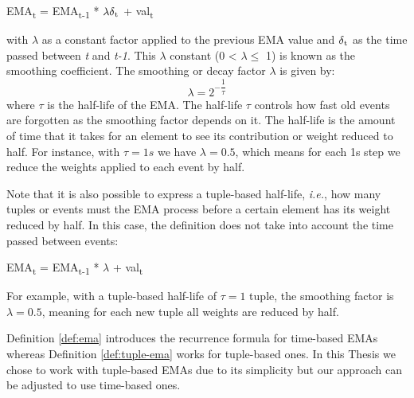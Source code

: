 \begin{definition}
EMA\textsubscript{t} = EMA\textsubscript{t-1} * $\lambda\delta\textsubscript{t}$ + val\textsubscript{t}
\label{def:ema}
\end{definition}

with $\lambda$ as a constant factor applied to the previous EMA value and $\delta\textsubscript{t}$ as the time passed between \textit{t} and \textit{t-1}. This $\lambda$ constant (0 < $\lambda \leq$ 1) is known as the smoothing coefficient. The smoothing or decay factor $\lambda$ is given by:
\begin{equation}
    \lambda = 2^{- \dfrac{1}{\tau}}
    \label{eq:ema-decay}
\end{equation}
where $\tau$ is the half-life of the EMA. The half-life $\tau$ controls how fast old events are forgotten as the smoothing factor depends on it. The half-life is the amount of time that it takes for an element to see its contribution or weight reduced to half. For instance, with $\tau = 1s$ we have $\lambda = 0.5$, which means for each 1s step we reduce the weights applied to each event by half. 

Note that it is also possible to express a tuple-based half-life, \textit{i.e.}, how many tuples or events must the EMA process before a certain element has its weight reduced by half. In this case, the definition does not take into account the time passed between events:
\begin{definition}
EMA\textsubscript{t} = EMA\textsubscript{t-1} * $\lambda$ + val\textsubscript{t}
\label{def:tuple-ema}
\end{definition}
For example, with a tuple-based half-life of $\tau = 1$ tuple, the smoothing factor is $\lambda = 0.5$, meaning for each new tuple all weights are reduced by half.

Definition \ref{def:ema} introduces the recurrence formula for time-based EMAs whereas Definition \ref{def:tuple-ema} works for tuple-based ones. In this Thesis we chose to work with tuple-based EMAs due to its simplicity but our approach can be adjusted to use time-based ones.